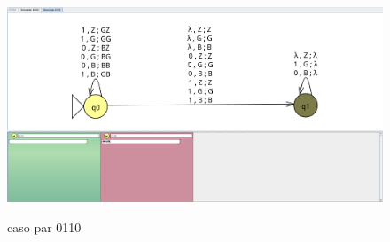 \documentclass{article}
\begin{document}
        \begin{figure}[!h]
            \centering
            \includegraphics[width=\textwidth]{./Imagenes/image31.png}
            \label{fig:label4}
            \caption{caso par 0110}
        \end{figure}
    
\end{document}
